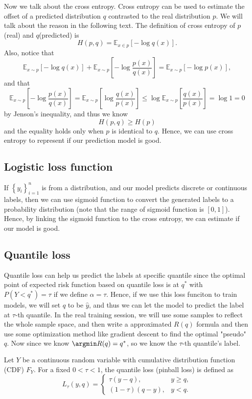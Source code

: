 Now we talk about the cross entropy. Cross entropy can be used to estimate the offset of a predicted distribution \(q\) contrasted to the real distribution \(p\). We will talk about the reason in the following text. The definition of cross entropy of \(p\)(real) and \(q\)(predicted)   is 
\[
	H(p,q) = \mathbb{E}_{x \in p} [- \log q(x)].
\]  
Also, notice that 
\[
	\mathbb{E} _{x \sim p}[-\log q(x)] + \mathbb{E} _{x \sim p} \left[ -\log \frac{p(x)}{q(x)} \right] = \mathbb{E} _{x \sim p} [- \log p(x)],
\]and that 
\[
	\mathbb{E}_{x\sim p}\left[ -\log \frac{p(x)}{q(x)}\right] = \mathbb{E}_{x\sim p}\left[\log \frac{q(x)}{p(x)} \right] \le \log \mathbb{E}_{x\sim p}\left[ \frac{q(x)}{p(x)}\right] = \log 1 = 0  
\] by Jenson's inequality, and thus we know 
\[
	H(p, q) \ge H(p)
\] and the equality holds only when \(p\) is identical to \(q\). Hence, we can use cross entropy to represent if our prediction model is good.

\subsection{Logistic loss function}
If \(\left\{ y_i \right\}_{i=1}^n \) is from a distribution, and our model predicts discrete or continuous labels, then we can use sigmoid function to convert the generated labels to a probability distribution (note that the range of sigmoid function is \([0, 1]\)). Hence, by linking the sigmoid function to the cross entropy, we can estimate if our model is good.

\subsection{Quantile loss}
Quantile loss can help us predict the labels at specific quantile since the optimal point of expected risk function based on quantile loss is at \(q^*\) with \(P(Y < q^*) = \tau \) if we define \(\alpha = \tau \). Hence, if we use this loss funciton to train models, we will set \(q\) to be \(\hat{y} \), and thus we can let the model to predict the label at \(\tau \)-th quantile. In the real training session, we will use some samples to reflect the whole sample space, and then write a approximated \(R(q)\) formula and then use some optimization method like gradient descent to find the optimal "pseudo" \(q\). Now since we know \(\argmin R(q) = q^*\), so we know the \(\tau \)-th quantile's label.     

Let $Y$ be a continuous random variable with cumulative distribution function (CDF) $F_Y$. For a fixed $0 < \tau < 1$, the quantile loss (pinball loss) is defined as
\[
L_\tau(y,q) =
\begin{cases} 
\tau (y-q), & y \ge q, \\
(1-\tau)(q-y), & y < q.
\end{cases}
\]


